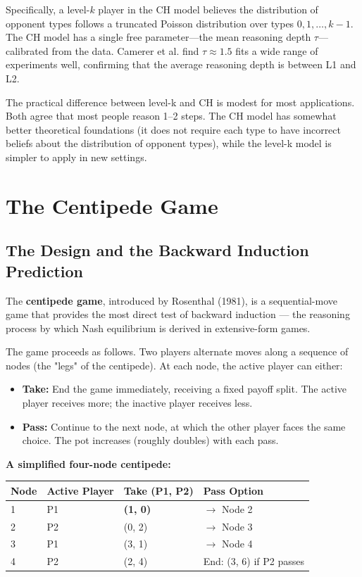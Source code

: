 \documentclass[12pt, letterpaper]{article}
\begin{document}
Specifically, a level-$k$ player in the CH model believes the distribution of opponent types follows a truncated Poisson distribution over types $0, 1, \ldots, k-1$. The CH model has a single free parameter---the mean reasoning depth $\tau$---calibrated from the data. Camerer et al. find $\tau \approx 1.5$ fits a wide range of experiments well, confirming that the average reasoning depth is between L1 and L2.

The practical difference between level-k and CH is modest for most applications. Both agree that most people reason 1--2 steps. The CH model has somewhat better theoretical foundations (it does not require each type to have incorrect beliefs about the distribution of opponent types), while the level-k model is simpler to apply in new settings.

\medskip


\section{The Centipede Game}



\subsection{The Design and the Backward Induction Prediction}


The \textbf{centipede game}, introduced by Rosenthal (1981), is a sequential-move game that provides the most direct test of backward induction --- the reasoning process by which Nash equilibrium is derived in extensive-form games.

The game proceeds as follows. Two players alternate moves along a sequence of nodes (the "legs" of the centipede). At each node, the active player can either:
\begin{itemize}
\item \textbf{Take:} End the game immediately, receiving a fixed payoff split. The active player receives more; the inactive player receives less.
\item \textbf{Pass:} Continue to the next node, at which the other player faces the same choice. The pot increases (roughly doubles) with each pass.
\end{itemize}

\textbf{A simplified four-node centipede:}


\begin{table}[H]
\centering
\small
\begin{tabularx}{\linewidth}{lYYY}
\toprule
Node & Active Player & Take (P1, P2) & Pass Option \\
 & P1 & \textbf{(1, 0)} & $\rightarrow$ Node 2 \\
2 & P2 & (0, 2) & $\rightarrow$ Node 3 \\
3 & P1 & (3, 1) & $\rightarrow$ Node 4 \\
4 & P2 & (2, 4) & End: (3, 6) if P2 passes \\
\bottomrule
\end{tabularx}
\end{table}
\end{document}
